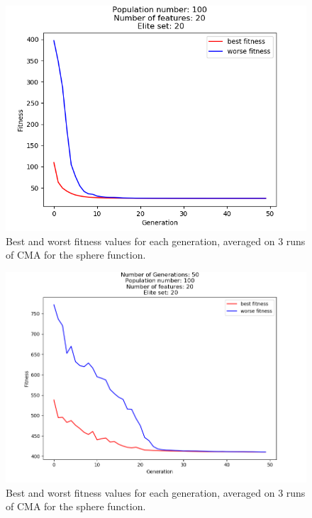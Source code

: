 \documentclass{article}
\begin{document}
\begin{figure}
	\centering
	\includegraphics[width=\textwidth]{CMA_d_sphere.png}
	\caption{ Best and worst fitness values for each generation, averaged on 3 runs of CMA for the sphere function.}
	\label{fig:image7}
\end{figure}

\begin{figure}
	\centering
	\includegraphics[width=\textwidth]{CMA_d_rastrigin.png}
	\caption{ Best and worst fitness values for each generation, averaged on 3 runs of CMA for the sphere function.}
	\label{fig:image8}
\end{figure}
\end{document}
